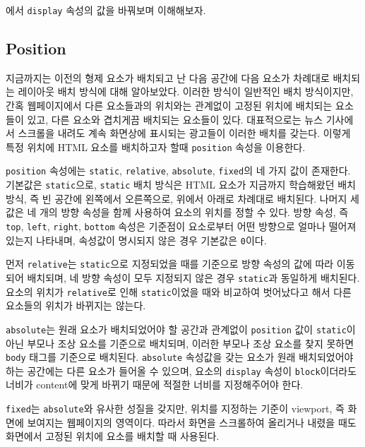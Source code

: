 에서 \texttt{display} 속성의 값을 바꿔보며 이해해보자. 

\subsection*{Position}

지금까지는 이전의 형제 요소가 배치되고 난 다음 공간에 다음 요소가 차례대로 배치되는 레이아웃 배치 방식에 대해 알아보았다. 이러한 방식이 일반적인 배치 방식이지만, 간혹 웹페이지에서 다른 요소들과의 위치와는 관계없이 고정된 위치에 배치되는 요소들이 있고, 다른 요소와 겹치게끔 배치되는 요소들이 있다. 대표적으로는 뉴스 기사에서 스크롤을 내려도 계속 화면상에 표시되는 광고들이 이러한 배치를 갖는다. 이렇게 특정 위치에 HTML 요소를 배치하고자 할때 \texttt{position} 속성을 이용한다.

\texttt{position} 속성에는 \texttt{static}, \texttt{relative}, \texttt{absolute}, \texttt{fixed}의 네 가지 값이 존재한다. 기본값은 \texttt{static}으로, \texttt{static} 배치 방식은 HTML 요소가 지금까지 학습해왔던 배치 방식, 즉 빈 공간에 왼쪽에서 오른쪽으로, 위에서 아래로 차례대로 배치된다. 나머지 세 값은 네 개의 방향 속성을 함께 사용하여 요소의 위치를 정할 수 있다. 방향 속성, 즉 \texttt{top}, \texttt{left}, \texttt{right}, \texttt{bottom} 속성은 기준점이 요소로부터 어떤 방향으로 얼마나 떨어져 있는지 나타내며, 속성값이 명시되지 않은 경우 기본값은 \texttt{0}이다.

먼저 \texttt{relative}는 \texttt{static}으로 지정되었을 때를 기준으로 방향 속성의 값에 따라 이동되어 배치되며, 네 방향 속성이 모두 지정되지 않은 경우 \texttt{static}과 동일하게 배치된다. 요소의 위치가 \texttt{relative}로 인해 \texttt{static}이었을 때와 비교하여 벗어났다고 해서 다른 요소들의 위치가 바뀌지는 않는다.

\texttt{absolute}는 원래 요소가 배치되었어야 할 공간과 관계없이 \texttt{position} 값이 \texttt{static}이 아닌 부모나 조상 요소를 기준으로 배치되며, 이러한 부모나 조상 요소를 찾지 못하면 \texttt{body} 태그를 기준으로 배치된다. \texttt{absolute} 속성값을 갖는 요소가 원래 배치되었어야 하는 공간에는 다른 요소가 들어올 수 있으며, 요소의 \texttt{display} 속성이 \texttt{block}이더라도 너비가 content에 맞게 바뀌기 때문에 적절한 너비를 지정해주어야 한다.

\texttt{fixed}는 \texttt{absolute}와 유사한 성질을 갖지만, 위치를 지정하는 기준이 viewport, 즉 화면에 보여지는 웹페이지의 영역이다. 따라서 화면을 스크롤하여 올리거나 내렸을 때도 화면에서 고정된 위치에 요소를 배치할 때 사용된다.

